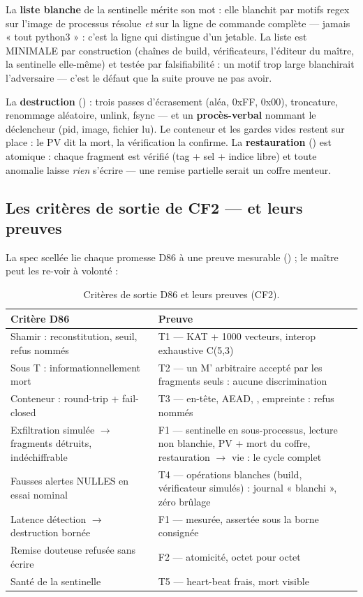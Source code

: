 La \textbf{liste blanche} de la sentinelle mérite son mot : elle blanchit par motifs
regex sur l'image de processus résolue \emph{et} sur la ligne de commande complète —
jamais « tout python3 » : c'est la ligne qui distingue  d'un
 jetable. La liste est MINIMALE par construction (chaînes de build,
vérificateurs, l'éditeur du maître, la sentinelle elle-même) et testée par
falsifiabilité : un motif trop large blanchirait l'adversaire — c'est le défaut que
la suite prouve ne pas avoir.

La \textbf{destruction} () : trois passes d'écrasement (aléa, 0xFF, 0x00),
troncature, renommage aléatoire, unlink, fsync — et un \textbf{procès-verbal} nommant
le déclencheur (pid, image, fichier lu). Le conteneur et les gardes vides restent sur
place : le PV dit la mort, la vérification la confirme. La \textbf{restauration}
() est atomique : chaque fragment est vérifié (tag + sel + indice
libre) et toute anomalie laisse \emph{rien} s'écrire — une remise partielle serait un
coffre menteur.

\subsection{Les critères de sortie de CF2 — et leurs preuves}

La spec scellée lie chaque promesse D86 à une preuve mesurable
() ; le maître peut les re-voir à volonté :

\begin{table}[htbp]
\centering\small
\caption{Critères de sortie D86 et leurs preuves (CF2).}
\label{tab:sortiecf2}
\begin{tabularx}{\textwidth}{@{}Y Y@{}}
\toprule
\textbf{Critère D86} & \textbf{Preuve} \\
\midrule
Shamir : reconstitution, seuil, refus nommés & T1 — KAT + 1000 vecteurs, interop
exhaustive C(5,3) \\
Sous T : informationnellement mort & T2 — un M' arbitraire accepté par les fragments
seuls : aucune discrimination \\
Conteneur : round-trip + fail-closed & T3 — en-tête, AEAD, , empreinte :
refus nommés \\
Exfiltration simulée $\to$ fragments détruits, indéchiffrable & F1 — sentinelle en
sous-processus, lecture non blanchie, PV + mort du coffre, restauration $\to$ vie : le
cycle complet \\
Fausses alertes NULLES en essai nominal & T4 — opérations blanches (build,
vérificateur simulés) : journal « blanchi », zéro brûlage \\
Latence détection $\to$ destruction bornée & F1 — mesurée, assertée sous la borne
consignée \\
Remise douteuse refusée sans écrire & F2 — atomicité, octet pour octet \\
Santé de la sentinelle & T5 — heart-beat frais, mort visible \\
\bottomrule
\end{tabularx}
\end{table}

